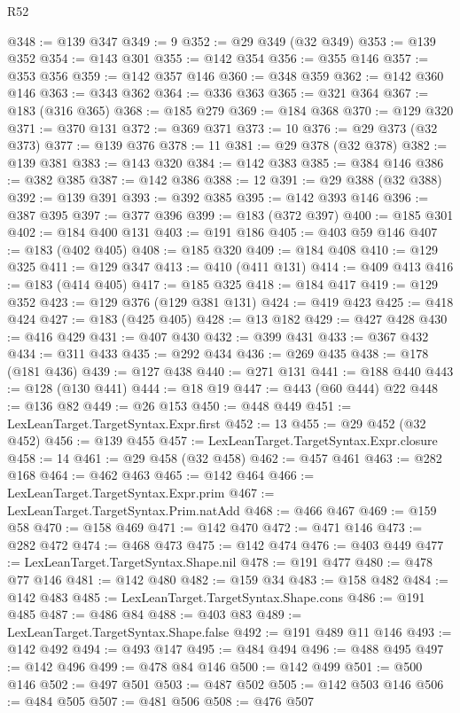 \begin{lexlean}{R52}
\begin{coremodule}
@348 := @139 @347
@349 := 9
@352 := @29 @349 (@32 @349)
@353 := @139 @352
@354 := @143 @301
@355 := @142 @354
@356 := @355 @146
@357 := @353 @356
@359 := @142 @357 @146
@360 := @348 @359
@362 := @142 @360 @146
@363 := @343 @362
@364 := @336 @363
@365 := @321 @364
@367 := @183 (@316 @365)
@368 := @185 @279
@369 := @184 @368
@370 := @129 @320
@371 := @370 @131
@372 := @369 @371
@373 := 10
@376 := @29 @373 (@32 @373)
@377 := @139 @376
@378 := 11
@381 := @29 @378 (@32 @378)
@382 := @139 @381
@383 := @143 @320
@384 := @142 @383
@385 := @384 @146
@386 := @382 @385
@387 := @142 @386
@388 := 12
@391 := @29 @388 (@32 @388)
@392 := @139 @391
@393 := @392 @385
@395 := @142 @393 @146
@396 := @387 @395
@397 := @377 @396
@399 := @183 (@372 @397)
@400 := @185 @301
@402 := @184 @400 @131
@403 := @191 @186
@405 := @403 @59 @146
@407 := @183 (@402 @405)
@408 := @185 @320
@409 := @184 @408
@410 := @129 @325
@411 := @129 @347
@413 := @410 (@411 @131)
@414 := @409 @413
@416 := @183 (@414 @405)
@417 := @185 @325
@418 := @184 @417
@419 := @129 @352
@423 := @129 @376 (@129 @381 @131)
@424 := @419 @423
@425 := @418 @424
@427 := @183 (@425 @405)
@428 := @13 @182
@429 := @427 @428
@430 := @416 @429
@431 := @407 @430
@432 := @399 @431
@433 := @367 @432
@434 := @311 @433
@435 := @292 @434
@436 := @269 @435
@438 := @178 (@181 @436)
@439 := @127 @438
@440 := @271 @131
@441 := @188 @440
@443 := @128 (@130 @441)
@444 := @18 @19
@447 := @443 (@60 @444) @22
@448 := @136 @82
@449 := @26 @153
@450 := @448 @449
@451 := LexLeanTarget.TargetSyntax.Expr.first
@452 := 13
@455 := @29 @452 (@32 @452)
@456 := @139 @455
@457 := LexLeanTarget.TargetSyntax.Expr.closure
@458 := 14
@461 := @29 @458 (@32 @458)
@462 := @457 @461
@463 := @282 @168
@464 := @462 @463
@465 := @142 @464
@466 := LexLeanTarget.TargetSyntax.Expr.prim
@467 := LexLeanTarget.TargetSyntax.Prim.natAdd
@468 := @466 @467
@469 := @159 @58
@470 := @158 @469
@471 := @142 @470
@472 := @471 @146
@473 := @282 @472
@474 := @468 @473
@475 := @142 @474
@476 := @403 @449
@477 := LexLeanTarget.TargetSyntax.Shape.nil
@478 := @191 @477
@480 := @478 @77 @146
@481 := @142 @480
@482 := @159 @34
@483 := @158 @482
@484 := @142 @483
@485 := LexLeanTarget.TargetSyntax.Shape.cons
@486 := @191 @485
@487 := @486 @84
@488 := @403 @83
@489 := LexLeanTarget.TargetSyntax.Shape.false
@492 := @191 @489 @11 @146
@493 := @142 @492
@494 := @493 @147
@495 := @484 @494
@496 := @488 @495
@497 := @142 @496
@499 := @478 @84 @146
@500 := @142 @499
@501 := @500 @146
@502 := @497 @501
@503 := @487 @502
@505 := @142 @503 @146
@506 := @484 @505
@507 := @481 @506
@508 := @476 @507

\end{coremodule}
\end{lexlean}
